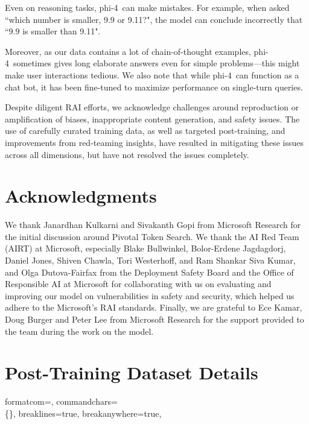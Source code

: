 \documentclass[11pt]{article}
\newcommand{\modelwithoutspace}{\textsf{phi-4}}
\newcommand{\model}{\modelwithoutspace~}
\begin{document}
Even on reasoning tasks, \model can make mistakes.  For example, when asked ``which number is smaller, 9.9 or 9.11?", the model can conclude incorrectly that ``9.9 is smaller than 9.11". 

Moreover, as our data contains a lot of chain-of-thought examples, \model sometimes gives long elaborate answers even for simple problems---this might make user interactions tedious. We also note that while \model can function as a chat bot, it has been fine-tuned to maximize performance on single-turn queries. 

Despite diligent RAI efforts, we acknowledge  challenges around  reproduction or amplification of biases, inappropriate content generation, and
safety issues. The use of carefully curated training data, as well as targeted post-training, and improvements
from red-teaming insights, have resulted in  mitigating these issues across all dimensions, but have not resolved the issues completely. 

\section*{Acknowledgments}
We thank Janardhan Kulkarni and Sivakanth Gopi from Microsoft Research for the initial discussion around Pivotal Token Search. We thank the AI Red Team (AIRT) at Microsoft, especially Blake Bullwinkel, Bolor-Erdene Jagdagdorj, Daniel Jones, Shiven Chawla, Tori Westerhoff, and Ram Shankar Siva Kumar, and Olga Dutova-Fairfax from the Deployment Safety Board and the Office of Responsible AI at Microsoft for collaborating with us on evaluating and improving our model on vulnerabilities in safety and security, which helped us adhere to the Microsoft's RAI standards. Finally, we are grateful to Ece Kamar, Doug Burger and Peter Lee from Microsoft Research for the support provided to the team during the work on the model.



\appendix


\section{Post-Training Dataset Details} \label{sec:post_train_appendix}

{
    formatcom=\color{black}, %
    commandchars=\\\{\},    %
    breaklines=true,         %
    breakanywhere=true,      %
}
\end{document}
